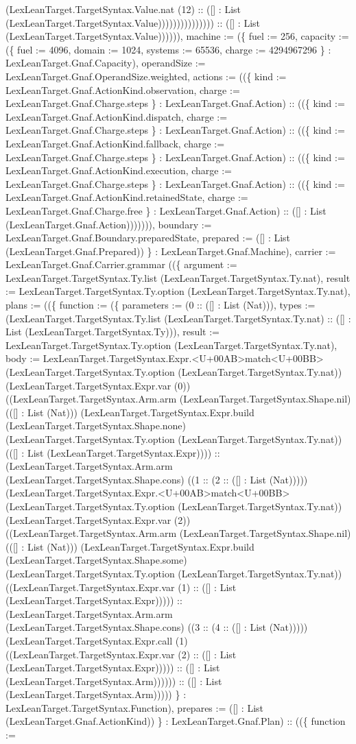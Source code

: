 \documentclass[11pt]{article}
\begin{document}
(LexLeanTarget.TargetSyntax.Value.nat (12) :: ([] : List (LexLeanTarget.TargetSyntax.Value))))))))))))))) :: ([] : List (LexLeanTarget.TargetSyntax.Value)))))), machine := (\{ fuel := 256, capacity := (\{ fuel := 4096, domain := 1024, systems := 65536, charge := 4294967296 \} : LexLeanTarget.Gnaf.Capacity), operandSize := LexLeanTarget.Gnaf.OperandSize.weighted, actions := ((\{ kind := LexLeanTarget.Gnaf.ActionKind.observation, charge := LexLeanTarget.Gnaf.Charge.steps \} : LexLeanTarget.Gnaf.Action) :: ((\{ kind := LexLeanTarget.Gnaf.ActionKind.dispatch, charge := LexLeanTarget.Gnaf.Charge.steps \} : LexLeanTarget.Gnaf.Action) :: ((\{ kind := LexLeanTarget.Gnaf.ActionKind.fallback, charge := LexLeanTarget.Gnaf.Charge.steps \} : LexLeanTarget.Gnaf.Action) :: ((\{ kind := LexLeanTarget.Gnaf.ActionKind.execution, charge := LexLeanTarget.Gnaf.Charge.steps \} : LexLeanTarget.Gnaf.Action) :: ((\{ kind := LexLeanTarget.Gnaf.ActionKind.retainedState, charge := LexLeanTarget.Gnaf.Charge.free \} : LexLeanTarget.Gnaf.Action) :: ([] : List (LexLeanTarget.Gnaf.Action))))))), boundary := LexLeanTarget.Gnaf.Boundary.preparedState, prepared := ([] : List (LexLeanTarget.Gnaf.Prepared)) \} : LexLeanTarget.Gnaf.Machine), carrier := LexLeanTarget.Gnaf.Carrier.grammar ((\{ argument := LexLeanTarget.TargetSyntax.Ty.list (LexLeanTarget.TargetSyntax.Ty.nat), result := LexLeanTarget.TargetSyntax.Ty.option (LexLeanTarget.TargetSyntax.Ty.nat), plans := ((\{ function := (\{ parameters := (0 :: ([] : List (Nat))), types := (LexLeanTarget.TargetSyntax.Ty.list (LexLeanTarget.TargetSyntax.Ty.nat) :: ([] : List (LexLeanTarget.TargetSyntax.Ty))), result := LexLeanTarget.TargetSyntax.Ty.option (LexLeanTarget.TargetSyntax.Ty.nat), body := LexLeanTarget.TargetSyntax.Expr.<U+00AB>match<U+00BB> (LexLeanTarget.TargetSyntax.Ty.option (LexLeanTarget.TargetSyntax.Ty.nat)) (LexLeanTarget.TargetSyntax.Expr.var (0)) ((LexLeanTarget.TargetSyntax.Arm.arm (LexLeanTarget.TargetSyntax.Shape.nil) (([] : List (Nat))) (LexLeanTarget.TargetSyntax.Expr.build (LexLeanTarget.TargetSyntax.Shape.none) (LexLeanTarget.TargetSyntax.Ty.option (LexLeanTarget.TargetSyntax.Ty.nat)) (([] : List (LexLeanTarget.TargetSyntax.Expr)))) :: (LexLeanTarget.TargetSyntax.Arm.arm (LexLeanTarget.TargetSyntax.Shape.cons) ((1 :: (2 :: ([] : List (Nat))))) (LexLeanTarget.TargetSyntax.Expr.<U+00AB>match<U+00BB> (LexLeanTarget.TargetSyntax.Ty.option (LexLeanTarget.TargetSyntax.Ty.nat)) (LexLeanTarget.TargetSyntax.Expr.var (2)) ((LexLeanTarget.TargetSyntax.Arm.arm (LexLeanTarget.TargetSyntax.Shape.nil) (([] : List (Nat))) (LexLeanTarget.TargetSyntax.Expr.build (LexLeanTarget.TargetSyntax.Shape.some) (LexLeanTarget.TargetSyntax.Ty.option (LexLeanTarget.TargetSyntax.Ty.nat)) ((LexLeanTarget.TargetSyntax.Expr.var (1) :: ([] : List (LexLeanTarget.TargetSyntax.Expr))))) :: (LexLeanTarget.TargetSyntax.Arm.arm (LexLeanTarget.TargetSyntax.Shape.cons) ((3 :: (4 :: ([] : List (Nat))))) (LexLeanTarget.TargetSyntax.Expr.call (1) ((LexLeanTarget.TargetSyntax.Expr.var (2) :: ([] : List (LexLeanTarget.TargetSyntax.Expr))))) :: ([] : List (LexLeanTarget.TargetSyntax.Arm)))))) :: ([] : List (LexLeanTarget.TargetSyntax.Arm))))) \} : LexLeanTarget.TargetSyntax.Function), prepares := ([] : List (LexLeanTarget.Gnaf.ActionKind)) \} : LexLeanTarget.Gnaf.Plan) :: ((\{ function := 
\end{document}
